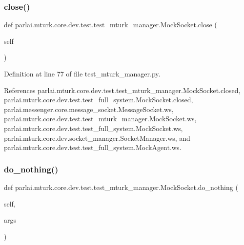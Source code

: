\subsubsection{\texorpdfstring{close()}{close()}}
{\footnotesize\ttfamily def parlai.\+mturk.\+core.\+dev.\+test.\+test\+\_\+mturk\+\_\+manager.\+Mock\+Socket.\+close (\begin{DoxyParamCaption}\item[{}]{self }\end{DoxyParamCaption})}



Definition at line 77 of file test\+\_\+mturk\+\_\+manager.\+py.



References parlai.\+mturk.\+core.\+dev.\+test.\+test\+\_\+mturk\+\_\+manager.\+Mock\+Socket.\+closed, parlai.\+mturk.\+core.\+dev.\+test.\+test\+\_\+full\+\_\+system.\+Mock\+Socket.\+closed, parlai.\+messenger.\+core.\+message\+\_\+socket.\+Message\+Socket.\+ws, parlai.\+mturk.\+core.\+dev.\+test.\+test\+\_\+mturk\+\_\+manager.\+Mock\+Socket.\+ws, parlai.\+mturk.\+core.\+dev.\+test.\+test\+\_\+full\+\_\+system.\+Mock\+Socket.\+ws, parlai.\+mturk.\+core.\+dev.\+socket\+\_\+manager.\+Socket\+Manager.\+ws, and parlai.\+mturk.\+core.\+dev.\+test.\+test\+\_\+full\+\_\+system.\+Mock\+Agent.\+ws.

\mbox{\label{classparlai_1_1mturk_1_1core_1_1dev_1_1test_1_1test__mturk__manager_1_1MockSocket_ab03ad0630dca832ec066900b06b2cdc9}} 
\subsubsection{\texorpdfstring{do\+\_\+nothing()}{do\_nothing()}}
{\footnotesize\ttfamily def parlai.\+mturk.\+core.\+dev.\+test.\+test\+\_\+mturk\+\_\+manager.\+Mock\+Socket.\+do\+\_\+nothing (\begin{DoxyParamCaption}\item[{}]{self,  }\item[{}]{args }\end{DoxyParamCaption})}



